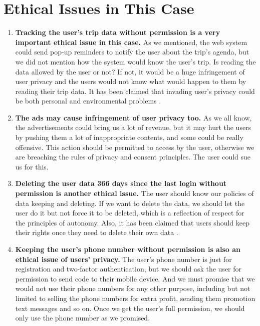 \documentclass[12pt]{article}
\begin{document}
\section{Ethical Issues in This Case}

\begin{enumerate}[label=\alph*)]
  \item \textbf{Tracking the user's trip data without permission is a very important ethical issue in this case.}
  As we mentioned, the web system could send pop-up reminders to notify the user about the trip's agenda, but we did not mention how the system would know the user's trip. Is reading the data allowed by the user or not? If not, it would be a huge infringement of user privacy and the users would not know what would happen to them by reading their trip data. It has been claimed that invading user's privacy could be both personal and environmental problems \citep{floridi2013ethics}.

  \item \textbf{The ads may cause infringement of user privacy too.}
  As we all know, the advertisements could bring us a lot of revenue, but it may hurt the users by pushing them a lot of inappropriate contents, and some could be really offensive. This action should be permitted to access by the user, otherwise we are breaching the rules of privacy and consent principles. The user could sue us for this.

  \item \textbf{Deleting the user data 366 days since the last login without permission is another ethical issue.}
  The user should know our policies of data keeping and deleting. If we want to delete the data, we should let the user do it but not force it to be deleted, which is a reflection of respect for the principles of autonomy. Also, it has been claimed that users should keep their rights once they need to delete their own data \citep{nissenbaum2009privacy}.

  \item \textbf{Keeping the user's phone number without permission is also an ethical issue of users' privacy.}
  The user's phone number is just for registration and two-factor authentication, but we should ask the user for permission to send code to their mobile device. And we must promise that we would not use their phone numbers for any other purpose, including but not limited to selling the phone numbers for extra profit, sending them promotion text messages and so on. Once we get the user's full permission, we should only use the phone number as we promised.
\end{enumerate}
\end{document}
